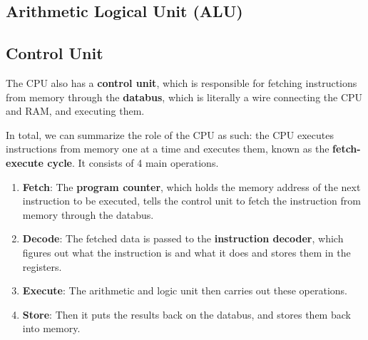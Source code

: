 \subsection{Arithmetic Logical Unit (ALU)}

\subsection{Control Unit} 

  The CPU also has a \textbf{control unit}, which is responsible for fetching instructions from memory through the \textbf{databus}, which is literally a wire connecting the CPU and RAM, and executing them. 

  In total, we can summarize the role of the CPU as such: the CPU executes instructions from memory one at a time and executes them, known as the \textbf{fetch-execute cycle}. It consists of 4 main operations. 
  \begin{enumerate} 
    \item \textbf{Fetch}: The \textbf{program counter}, which holds the memory address of the next instruction to be executed, tells the control unit to fetch the instruction from memory through the databus. 
    \item \textbf{Decode}: The fetched data is passed to the \textbf{instruction decoder}, which figures out what the instruction is and what it does and stores them in the registers.
    \item \textbf{Execute}: The arithmetic and logic unit then carries out these operations. 
    \item \textbf{Store}: Then it puts the results back on the databus, and stores them back into memory.
  \end{enumerate} 

